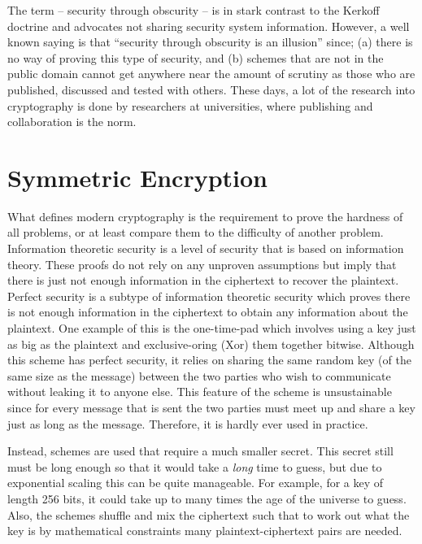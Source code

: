\documentclass[ %
                    author={Samuel Russell},
                supervisor={Prof. Bogdan Warinschi},
                    degree={MEng},
                     title={Innocuous Ciphertexts},
                  subtitle={The DE-CENSOR Scheme},
                      type={Research},
                      year={2018} ]{dissertation}
\begin{document}
The term -- security through obscurity -- is in stark contrast to the Kerkoff doctrine and advocates not sharing security system information.
However, a well known saying is that ``security through obscurity is an illusion'' since; (a) there is no way of proving this type of security, and (b) schemes that are not in the public domain cannot get anywhere near the amount of scrutiny as those who are published, discussed and tested with others.
These days, a lot of the research into cryptography is done by researchers at universities, where publishing and collaboration is the norm.

\section{Symmetric Encryption}

What defines modern cryptography is the requirement to prove the hardness of all problems, or at least compare them to the difficulty of another problem.
Information theoretic security is a level of security that is based on information theory.
These proofs do not rely on any unproven assumptions but imply that there is just not enough information in the ciphertext to recover the plaintext.
Perfect security is a subtype of information theoretic security which proves there is not enough information in the ciphertext to obtain any information about the plaintext.
One example of this is the one-time-pad which involves using a key just as big as the plaintext and exclusive-oring (Xor) them together bitwise.
Although this scheme has perfect security, it relies on sharing the same random key (of the same size as the message) between the two parties who wish to communicate without leaking it to anyone else.
This feature of the scheme is unsustainable since for every message that is sent the two parties must meet up and share a key just as long as the message.
Therefore, it is hardly ever used in practice.

Instead, schemes are used that require a much smaller secret.
This secret still must be long enough so that it would take a \textit{long} time to guess, but due to exponential scaling this can be quite manageable.
For example, for a key of length 256 bits, it could take up to many times the age of the universe to guess.
Also, the schemes shuffle and mix the ciphertext such that to work out what the key is by mathematical constraints many plaintext-ciphertext pairs are needed.
\end{document}
